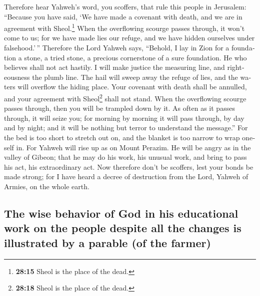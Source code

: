 \begin{paracol}{2}
\begin{otherlanguage}{english}
 Therefore hear Yahweh's word, you scoffers, that rule
this people in Jerusalem:  ``Because you have said, `We
have made a covenant with death, and we are in agreement with
Sheol.\footnote{\textbf{28:15} Sheol is the place of the dead.} When the
overflowing scourge passes through, it won't come to us; for we have
made lies our refuge, and we have hidden ourselves under falsehood.'\,''
 Therefore the Lord Yahweh says, ``Behold, I lay in Zion
for a foundation a stone, a tried stone, a precious cornerstone of a
sure foundation. He who believes shall not act hastily. 
I will make justice the measuring line, and righteousness the plumb
line. The hail will sweep away the refuge of lies, and the waters will
overflow the hiding place.  Your covenant with death
shall be annulled, and your agreement with Sheol\footnote{\textbf{28:18}
  Sheol is the place of the dead.} shall not stand. When the overflowing
scourge passes through, then you will be trampled down by it.
 As often as it passes through, it will seize you; for
morning by morning it will pass through, by day and by night; and it
will be nothing but terror to understand the message.'' 
For the bed is too short to stretch out on, and the blanket is too
narrow to wrap oneself in.  For Yahweh will rise up as on
Mount Perazim. He will be angry as in the valley of Gibeon; that he may
do his work, his unusual work, and bring to pass his act, his
extraordinary act.  Now therefore don't be scoffers, lest
your bonds be made strong; for I have heard a decree of destruction from
the Lord, Yahweh of Armies, on the whole earth.

\hypertarget{the-wise-behavior-of-god-in-his-educational-work-on-the-people-despite-all-the-changes-is-illustrated-by-a-parable-of-the-farmer}{%
\subsection{The wise behavior of God in his educational work on the
people despite all the changes is illustrated by a parable (of the
farmer)}\label{the-wise-behavior-of-god-in-his-educational-work-on-the-people-despite-all-the-changes-is-illustrated-by-a-parable-of-the-farmer}}


\end{otherlanguage}
\end{paracol}
